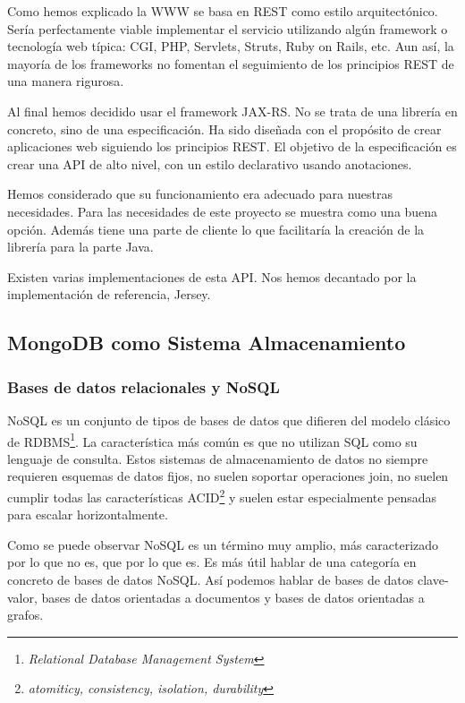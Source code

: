 Como hemos explicado la WWW se basa en REST como estilo
arquitectónico. Sería perfectamente viable implementar el servicio
utilizando algún framework o tecnología web típica: CGI, PHP,
Servlets, Struts, Ruby on Rails, etc. Aun así, la mayoría de los
frameworks no fomentan el seguimiento de los principios REST de una
manera rigurosa.

Al final hemos decidido usar el framework JAX-RS. No se trata de una
librería en concreto, sino de una especificación. Ha sido diseñada con
el propósito de crear aplicaciones web siguiendo los principios
REST. El objetivo de la especificación es crear una API de alto nivel,
con un estilo declarativo usando anotaciones.

Hemos considerado que su funcionamiento era adecuado para nuestras
necesidades. Para las necesidades de este proyecto se muestra como una
buena opción. Además tiene una parte de cliente lo que facilitaría la
creación de la librería para la parte Java.

Existen varias implementaciones de esta API. Nos hemos decantado por
la implementación de referencia, Jersey\cite{JERSEY}.

\subsection{MongoDB como Sistema Almacenamiento}
\subsubsection{Bases de datos relacionales y NoSQL}

NoSQL es un conjunto de tipos de bases de datos que difieren del
modelo clásico de RDBMS\footnote{\emph{Relational Database Management
    System}}. La característica más común es que no utilizan SQL como
su lenguaje de consulta. Estos sistemas de almacenamiento de datos no
siempre requieren esquemas de datos fijos, no suelen soportar
operaciones join, no suelen cumplir todas las características
ACID\footnote{\emph{atomiticy, consistency, isolation, durability}} y
suelen estar especialmente pensadas para escalar horizontalmente.

Como se puede observar NoSQL es un término muy amplio, más
caracterizado por lo que no es, que por lo que es. Es más útil hablar
de una categoría en concreto de bases de datos NoSQL. Así podemos
hablar de bases de datos clave-valor, bases de datos orientadas a
documentos y bases de datos orientadas a grafos.

